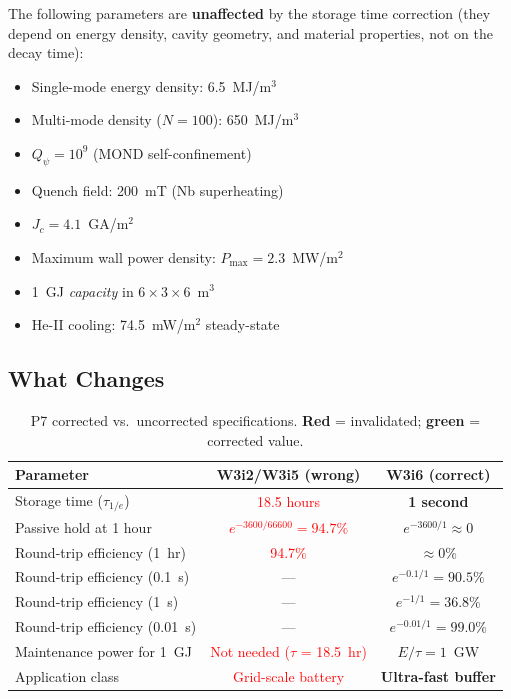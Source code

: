 \documentclass[11pt]{article}
\theoremstyle{definition}
\theoremstyle{remark}
\newcommand{\Qpsi}{Q_\psi}
\newcommand{\Pmax}{P_{\mathrm{max}}}
\begin{document}
The following parameters are \textbf{unaffected} by the storage time
correction (they depend on energy density, cavity geometry, and material
properties, not on the decay time):
\begin{itemize}[nosep]
\item Single-mode energy density: 6.5~MJ/m$^3$
\item Multi-mode density ($N=100$): 650~MJ/m$^3$
\item $\Qpsi = 10^9$ (MOND self-confinement)
\item Quench field: 200~mT (Nb superheating)
\item $J_c = 4.1$~GA/m$^2$
\item Maximum wall power density: $\Pmax = 2.3$~MW/m$^2$
\item 1~GJ \emph{capacity} in $6\times3\times6$~m$^3$
\item He-II cooling: 74.5~mW/m$^2$ steady-state
\end{itemize}

\subsection{What Changes}

\begin{table}[h]
\centering
\caption{P7 corrected vs.\ uncorrected specifications.
\textbf{Red} = invalidated; \textbf{green} = corrected value.}
\label{tab:P7-corrected}
\begin{tabular}{@{}p{5cm}cc@{}}
\toprule
Parameter & W3i2/W3i5 (wrong) & W3i6 (correct) \\
\midrule
Storage time ($\tau_{1/e}$)
  & \textcolor{red}{18.5 hours}
  & \textcolor{green!50!black}{\textbf{1 second}} \\[4pt]
Passive hold at 1 hour
  & \textcolor{red}{$e^{-3600/66600} = 94.7\%$}
  & \textcolor{green!50!black}{$e^{-3600/1} \approx 0$} \\[4pt]
Round-trip efficiency (1~hr)
  & \textcolor{red}{94.7\%}
  & \textcolor{green!50!black}{$\approx 0\%$} \\[4pt]
Round-trip efficiency (0.1~s)
  & ---
  & \textcolor{green!50!black}{$e^{-0.1/1} = 90.5\%$} \\[4pt]
Round-trip efficiency (1~s)
  & ---
  & \textcolor{green!50!black}{$e^{-1/1} = 36.8\%$} \\[4pt]
Round-trip efficiency (0.01~s)
  & ---
  & \textcolor{green!50!black}{$e^{-0.01/1} = 99.0\%$} \\[4pt]
Maintenance power for 1~GJ
  & \textcolor{red}{Not needed ($\tau$ = 18.5~hr)}
  & \textcolor{green!50!black}{$E/\tau = 1$~GW} \\[4pt]
Application class
  & \textcolor{red}{Grid-scale battery}
  & \textcolor{green!50!black}{\textbf{Ultra-fast buffer}} \\
\bottomrule
\end{tabular}
\end{table}
\end{document}
